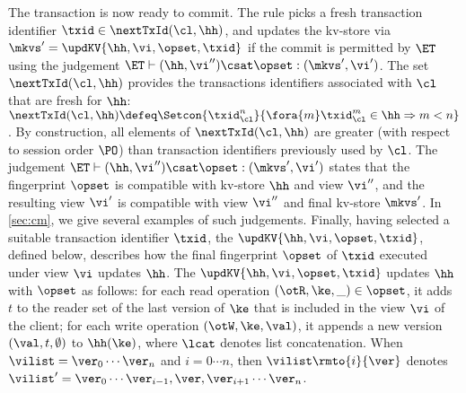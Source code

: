 The transaction is now ready to commit. The rule picks a fresh transaction identifier $\txid \in \nextTxId(\cl, \hh)$, 
and updates the kv-store via $\mkvs' = \updKV{\hh, \vi, \opset, \txid}$
if the commit is permitted by $\ET$ using the judgement $\ET \vdash (\hh, \vi'') \csat \opset : (\mkvs', \vi')$.
The set $\nextTxId(\cl, \hh)$ provides the transactions identifiers
associated with $\cl$ that are fresh for  $\hh$:
$
\nextTxId(\cl, \hh) \defeq \Setcon{\txid_{\cl}^{n}}{\fora{m}
  \txid_{\cl}^{m} \in \hh \Rightarrow m < n }
$.
By construction, all elements of $\nextTxId(\cl, \hh)$ are greater (with respect to session order $\PO$) 
than transaction identifiers previously used by $\cl$. 
The judgement $\ET \vdash (\hh, \vi'') \csat \opset : (\mkvs', \vi')$
states that the fingerprint $\opset$ is compatible with kv-store $\hh$
and view $\vi''$, and the resulting view $\vi'$ 
is compatible with view \( \vi'' \) and final kv-store \( \mkvs' \).
In \cref{sec:cm}, we give several examples of such judgements.
%
%
%
%
Finally, having selected a suitable transaction identifier $\txid$,
the $\updKV{\hh, \vi, \opset, \txid}$, defined below, describes how the final fingerprint $\opset$ of $\txid$ executed 
under view $\vi$ updates $\hh$. 
The $\updKV{\hh, \vi, \opset, \txid}$ updates $\hh$ with $\opset$ as follows: 
for each read operation $(\otR, \ke, \_) \in \opset$, it adds $t$ 
to the reader set of the last version of $\ke$ that is included in the view $\vi$ of the client; 
for each write operation $(\otW, \ke, \val)$, it appends a new version $(\val, t, \emptyset)$ 
to $\hh(\ke)$, where $\lcat$ denotes list concatenation.
When $\vilist = \ver_0 \cdots \ver_n$ and $i=0 \cdots n$, 
then $\vilist\rmto{i}{\ver}$ denotes 
$\vilist' = \ver_0 \cdots \ver_{i-1}, \ver, \ver_{i+1} \cdots \ver_{n}$. 

